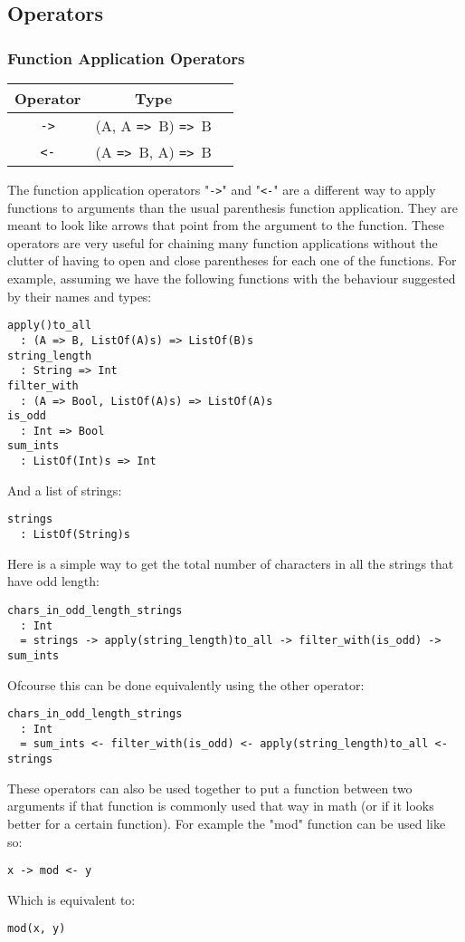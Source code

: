 \documentclass{article}
\def\ra{\texttt{=>}\ }
\begin{document}
\subsection{Operators}

\subsubsection{Function Application Operators}

\begin{center}
\begin{tabular}{ |c|c|c| } 
\hline
Operator & Type \\ 
\hline
\hline
\texttt{->} & (A, A \ra B) \ra B \\
\hline
\texttt{<-} & (A \ra B, A) \ra B \\
\hline
\end{tabular}
\end{center}
The function application operators "\texttt{->}" and "\texttt{<-}" are a
different way to apply functions to arguments than the usual parenthesis
function application.  They are meant to look like arrows that point from the
argument to the function.  These operators are very useful for chaining many
function applications without the clutter of having to open and close
parentheses for each one of the functions.  For example, assuming we have the
following functions with the behaviour suggested by their names and types:
\begin{verbatim}
apply()to_all
  : (A => B, ListOf(A)s) => ListOf(B)s
string_length
  : String => Int
filter_with
  : (A => Bool, ListOf(A)s) => ListOf(A)s
is_odd
  : Int => Bool
sum_ints
  : ListOf(Int)s => Int
\end{verbatim}
And a list of strings:
\begin{verbatim}
strings
  : ListOf(String)s
\end{verbatim}
Here is a simple way to get the total number of characters in all the strings
that have odd length:
\begin{verbatim}
chars_in_odd_length_strings
  : Int
  = strings -> apply(string_length)to_all -> filter_with(is_odd) -> sum_ints
\end{verbatim}
Ofcourse this can be done equivalently using the other operator:
\begin{verbatim}
chars_in_odd_length_strings
  : Int
  = sum_ints <- filter_with(is_odd) <- apply(string_length)to_all <- strings

\end{verbatim}
These operators can also be used together to put a function between two arguments
if that function is commonly used that way in math (or if it looks better for a
certain function). For example the "mod" function can be used like so:
\begin{center}
\texttt{x -> mod <- y}
\end{center}
Which is equivalent to:
\begin{center}
\texttt{mod(x, y)}
\end{center}
\end{document}
